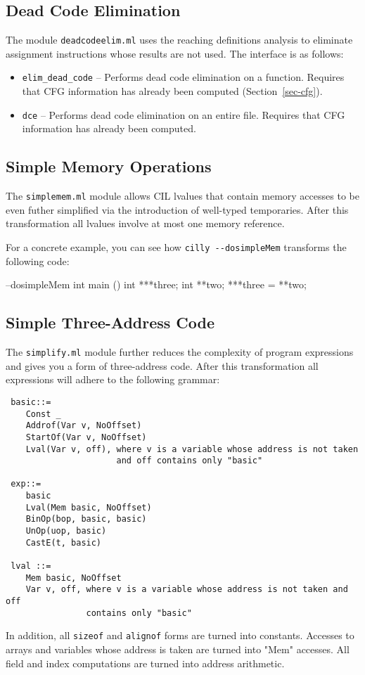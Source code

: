 \documentclass{article}
\def\secref#1{Section~\ref{sec-#1}}
\def\t#1{{\tt #1}}
\begin{document}
\subsection{Dead Code Elimination}

The module \t{deadcodeelim.ml} uses the reaching definitions
analysis to eliminate assignment instructions whose results
are not used. The interface is as follows:

\begin{itemize}
\item \t{elim\_dead\_code} -- Performs dead code elimination
on a function. Requires that CFG information has already
been computed (\secref{cfg}).
\item \t{dce} -- Performs dead code elimination on an
entire file. Requires that CFG information has already
been computed.
\end{itemize}

\subsection{Simple Memory Operations} 

The \t{simplemem.ml} module allows CIL lvalues that contain memory
accesses to be even futher simplified via the introduction of
well-typed temporaries. After this transformation all lvalues involve
at most one memory reference.

For a concrete example, you can see how \t{cilly -{}-dosimpleMem} 
transforms the following code:

\begin{cilcode}[global] --dosimpleMem
  int main () {
    int ***three;
    int **two;
    ***three = **two; 
  } 
\end{cilcode}

\subsection{Simple Three-Address Code} 

The \t{simplify.ml} module further reduces the complexity of program
expressions and gives you a form of three-address code. After this
transformation all expressions will adhere to the following grammar: 
\begin{verbatim}
 basic::=
    Const _ 
    Addrof(Var v, NoOffset)
    StartOf(Var v, NoOffset)
    Lval(Var v, off), where v is a variable whose address is not taken
                      and off contains only "basic"

 exp::=
    basic
    Lval(Mem basic, NoOffset)
    BinOp(bop, basic, basic)
    UnOp(uop, basic)
    CastE(t, basic)
   
 lval ::= 
    Mem basic, NoOffset
    Var v, off, where v is a variable whose address is not taken and off
                contains only "basic"
\end{verbatim}
In addition, all \t{sizeof} and \t{alignof} forms are turned into
constants. Accesses to arrays and variables whose address is taken are
turned into "Mem" accesses. All field and index computations are turned
into address arithmetic.
\end{document}
